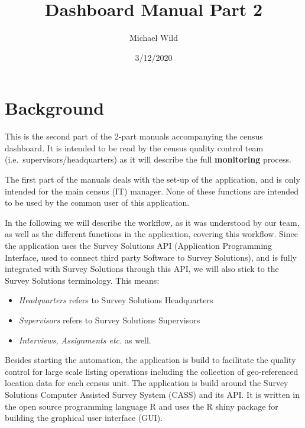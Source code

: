 \documentclass[a4paper]{article}
\title{Dashboard Manual Part 2}
\author{Michael Wild}
\date{3/12/2020}
\providecommand{\tightlist}{%
  \setlength{\itemsep}{0pt}\setlength{\parskip}{0pt}}
\begin{document}
\maketitle

{
\hypersetup{linkcolor=}
\setcounter{tocdepth}{2}
\tableofcontents
}
\newpage

\hypertarget{background}{%
\section{Background}\label{background}}

This is the second part of the 2-part manuals accompanying the census dashboard. It is intended to be read by the census quality control team (i.e.~supervisors/headquarters) as it will describe the full \textbf{monitoring} process.

The first part of the manuals deals with the set-up of the application, and is only intended for the main census (IT) manager. None of these functions are intended to be used by the common user of this application.

In the following we will describe the workflow, as it was understood by our team, as well as the different functions in the application, covering this workflow. Since the application uses the Survey Solutions API (Application Programming Interface, used to connect third party Software to Survey Solutions), and is fully integrated with Survey Solutions through this API, we will also stick to the Survey Solutions terminology. This means:

\begin{itemize}
\tightlist
\item
  \textit{Headquarters} refers to Survey Solutions Headquarters
\item
  \textit{Supervisors} refers to Survey Solutions Supervisors
\item
  \textit{Interviews, Assignments etc.} as well.
\end{itemize}

Besides starting the automation, the application is build to facilitate the quality control for large scale listing operations including the collection of geo-referenced location data for each census unit. The application is build around the Survey Solutions Computer Assisted Survey System (CASS) and its API. It is written in the open source programming language R and uses the R shiny package for building the graphical user interface (GUI). \newline
\end{document}
